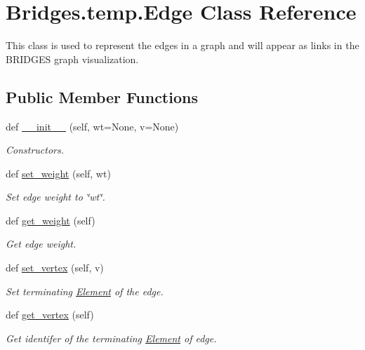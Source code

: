 \hypertarget{class_bridges_1_1temp_1_1_edge}{}\section{Bridges.\+temp.\+Edge Class Reference}
\label{class_bridges_1_1temp_1_1_edge}


This class is used to represent the edges in a graph and will appear as links in the B\+R\+I\+D\+G\+ES graph visualization.  


\subsection*{Public Member Functions}
\begin{DoxyCompactItemize}
\item 
def \mbox{\hyperlink{class_bridges_1_1temp_1_1_edge_a04dbca99e0561c248750fc3e7bf4121a}{\+\_\+\+\_\+init\+\_\+\+\_\+}} (self, wt=None, v=None)
\begin{DoxyCompactList}\small\item\em Constructors. \end{DoxyCompactList}\item 
def \mbox{\hyperlink{class_bridges_1_1temp_1_1_edge_aef8afe938081b6033a794d70eb760491}{set\+\_\+weight}} (self, wt)
\begin{DoxyCompactList}\small\item\em Set edge weight to \char`\"{}wt\char`\"{}. \end{DoxyCompactList}\item 
def \mbox{\hyperlink{class_bridges_1_1temp_1_1_edge_a53a82067c49396e22289f923c3d3b713}{get\+\_\+weight}} (self)
\begin{DoxyCompactList}\small\item\em Get edge weight. \end{DoxyCompactList}\item 
def \mbox{\hyperlink{class_bridges_1_1temp_1_1_edge_aab4c8151036ff96a35183787761707be}{set\+\_\+vertex}} (self, v)
\begin{DoxyCompactList}\small\item\em Set terminating \mbox{\hyperlink{namespace_bridges_1_1_element}{Element}} of the edge. \end{DoxyCompactList}\item 
def \mbox{\hyperlink{class_bridges_1_1temp_1_1_edge_a109b488c745b70c48f45b9a78d311c7a}{get\+\_\+vertex}} (self)
\begin{DoxyCompactList}\small\item\em Get identifer of the terminating \mbox{\hyperlink{namespace_bridges_1_1_element}{Element}} of edge. \end{DoxyCompactList}\item 

\end{DoxyCompactItemize}
